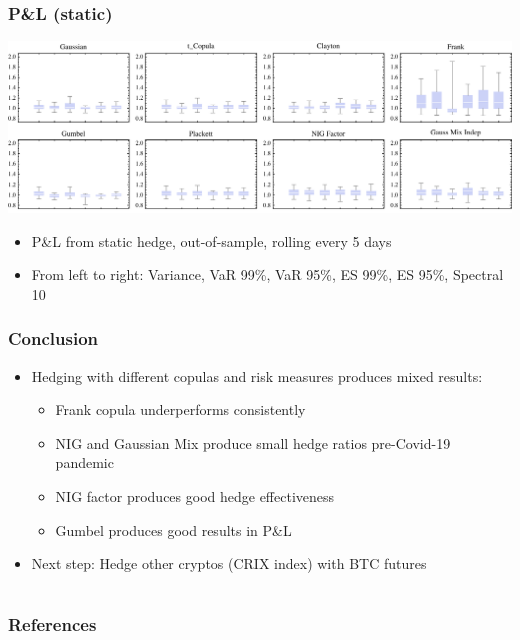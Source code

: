 \documentclass[10pt,mathserif]{beamer}
\renewcommand{\(}{\begin{columns}}
\renewcommand{\)}{\end{columns}}
\newcommand{\<}[1]{\begin{column}{#1}}
\renewcommand{\>}{\end{column}}
\theoremstyle{definition}
\begin{document}
\begin{frame}
  \frametitle{P\&L (static)}
  \hspace*{-0.75cm}\includegraphics[scale=0.65]{../_pics/PL_static_out.pdf}
  \begin{itemize}
  \item P\&L from static hedge, out-of-sample, rolling every
    5 days
  \item From left to right: Variance, VaR 99\%, VaR 95\%, ES 99\%, ES
    95\%, Spectral 10
  \end{itemize}
\end{frame}

\begin{frame}
  \frametitle{Conclusion}
  \begin{itemize}
    \addtolength{\itemsep}{3pt}
  \item Hedging with different copulas and risk measures produces
    mixed results:
    \begin{itemize}
      \addtolength{\itemsep}{3pt}
    \item Frank copula underperforms consistently
    \item NIG and Gaussian Mix produce small hedge ratios pre-Covid-19
      pandemic
    \item NIG factor produces good hedge effectiveness
    \item Gumbel produces good results in P\&L
    \end{itemize}
  \item Next step: Hedge other cryptos (CRIX index) with BTC futures
  \end{itemize}
\end{frame}

\section*{}


\begin{frame}[allowframebreaks]
  \frametitle{References} {\footnotesize %
  }
\end{frame}
\end{document}
